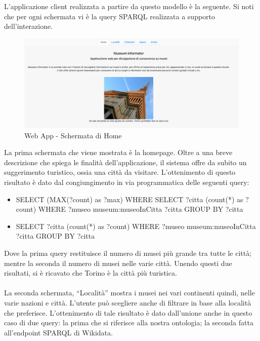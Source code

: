 \documentclass[12pt]{article}
\begin{document}
L’applicazione client realizzata a partire da questo modello è la seguente. Si noti che per ogni schermata vi è la query SPARQL realizzata a supporto dell’interazione.

\begin{figure}[!ht]
   \centering
   \includegraphics[scale=0.35]{fig/Schemata 1 webapp.png}
   \caption{Web App - Schermata di Home}\label{fig:picture}
\end{figure}

La prima schermata che viene mostrata è la homepage. Oltre a una breve descrizione che spiega le finalità dell’applicazione, il sistema offre da subito un suggerimento turistico, ossia una città da visitare.
L’ottenimento di questo risultato è dato dal congiungimento in via programmatica delle seguenti query:

\begin{itemize}
 \item SELECT (MAX(?count) as ?max) WHERE{ SELECT ?citta (count(*) as ?count) WHERE { ?museo museum:museoInCitta ?citta} GROUP BY ?citta}
 \item SELECT ?citta (count(*) as ?count) WHERE { ?museo museum:museoInCitta ?citta} GROUP BY ?citta
\end{itemize} 

Dove la prima query restituisce il numero di musei più grande tra tutte le città; mentre la seconda il numero di musei nelle varie città. Unendo questi due risultati, si è ricavato che Torino è la città più turistica. 
\\
\\
La seconda schermata, “Località” mostra i musei nei vari continenti quindi, nelle varie nazioni e città. L’utente può scegliere anche di filtrare in base alla località che preferisce. L’ottenimento di tale risultato è dato dall’unione anche in questo caso di due query: la prima che si riferisce alla nostra ontologia; la seconda fatta all’endpoint SPARQL di Wikidata.
\end{document}
